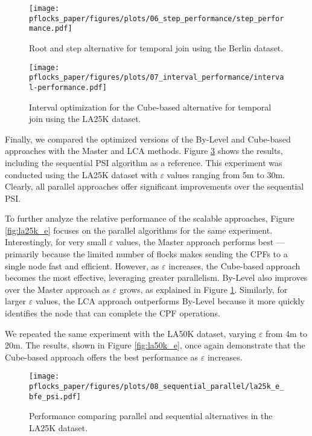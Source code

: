 \begin{figure}
    \centering
    \texttt{[image: pflocks\_paper/figures/plots/06\_step\_performance/step\_performance.pdf]}
    \caption{Root and step alternative for temporal join using the Berlin dataset.}\label{fig:step_performance}
\end{figure}

\begin{figure}
    \centering
    \texttt{[image: pflocks\_paper/figures/plots/07\_interval\_performance/interval-performance.pdf]}
    \caption{Interval optimization for the Cube-based alternative for temporal join using the LA25K dataset.}\label{fig:interval_performance}
\end{figure}

Finally, we compared the optimized versions of the By-Level and Cube-based approaches with the Master and LCA methods. Figure \ref{fig:la25k_e_bfe_psi} shows the results, including the sequential PSI algorithm as a reference. This experiment was conducted using the LA25K dataset with $\varepsilon$ values ranging from 5m to 30m. Clearly, all parallel approaches offer significant improvements over the sequential PSI.

To further analyze the relative performance of the scalable approaches, Figure \ref{fig:la25k_e} focuses on the parallel algorithms for the same experiment. Interestingly, for very small $\varepsilon$ values, the Master approach performs best —primarily because the limited number of flocks makes sending the CPFs to a single node fast and efficient. However, as $\varepsilon$ increases, the Cube-based approach becomes the most effective, leveraging greater parallelism. By-Level also improves over the Master approach as $\varepsilon$ grows, as explained in Figure \ref{fig:step_performance}. Similarly, for larger $\varepsilon$ values, the LCA approach outperforms By-Level because it more quickly identifies the node that can complete the CPF operations.

We repeated the same experiment with the LA50K dataset, varying $\varepsilon$ from 4m to 20m. The results, shown in Figure \ref{fig:la50k_e}, once again demonstrate that the Cube-based approach offers the best performance as $\varepsilon$ increases.

\begin{figure}
    \centering
    \texttt{[image: pflocks\_paper/figures/plots/08\_sequential\_parallel/la25k\_e\_bfe\_psi.pdf]}
    \caption{Performance comparing parallel and sequential alternatives in the LA25K dataset.}\label{fig:la25k_e_bfe_psi}
\end{figure}

